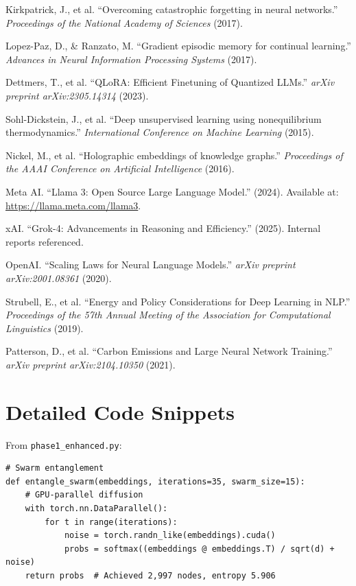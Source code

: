 \documentclass[12pt,a4paper]{article}
\begin{document}
\begin{thebibliography}{99}

Kirkpatrick, J., et al. ``Overcoming catastrophic forgetting in neural networks.'' \textit{Proceedings of the National Academy of Sciences} (2017).

Lopez-Paz, D., \& Ranzato, M. ``Gradient episodic memory for continual learning.'' \textit{Advances in Neural Information Processing Systems} (2017).

Dettmers, T., et al. ``QLoRA: Efficient Finetuning of Quantized LLMs.'' \textit{arXiv preprint arXiv:2305.14314} (2023).

Sohl-Dickstein, J., et al. ``Deep unsupervised learning using nonequilibrium thermodynamics.'' \textit{International Conference on Machine Learning} (2015).

Nickel, M., et al. ``Holographic embeddings of knowledge graphs.'' \textit{Proceedings of the AAAI Conference on Artificial Intelligence} (2016).

Meta AI. ``Llama 3: Open Source Large Language Model.'' (2024). Available at: \url{https://llama.meta.com/llama3}.

xAI. ``Grok-4: Advancements in Reasoning and Efficiency.'' (2025). Internal reports referenced.

OpenAI. ``Scaling Laws for Neural Language Models.'' \textit{arXiv preprint arXiv:2001.08361} (2020).

Strubell, E., et al. ``Energy and Policy Considerations for Deep Learning in NLP.'' \textit{Proceedings of the 57th Annual Meeting of the Association for Computational Linguistics} (2019).

Patterson, D., et al. ``Carbon Emissions and Large Neural Network Training.'' \textit{arXiv preprint arXiv:2104.10350} (2021).

\end{thebibliography}

\appendix

\section{Detailed Code Snippets}

From \texttt{phase1\_enhanced.py}:
\begin{lstlisting}
# Swarm entanglement
def entangle_swarm(embeddings, iterations=35, swarm_size=15):
    # GPU-parallel diffusion
    with torch.nn.DataParallel():
        for t in range(iterations):
            noise = torch.randn_like(embeddings).cuda()
            probs = softmax((embeddings @ embeddings.T) / sqrt(d) + noise)
    return probs  # Achieved 2,997 nodes, entropy 5.906
\end{lstlisting}
\end{document}
